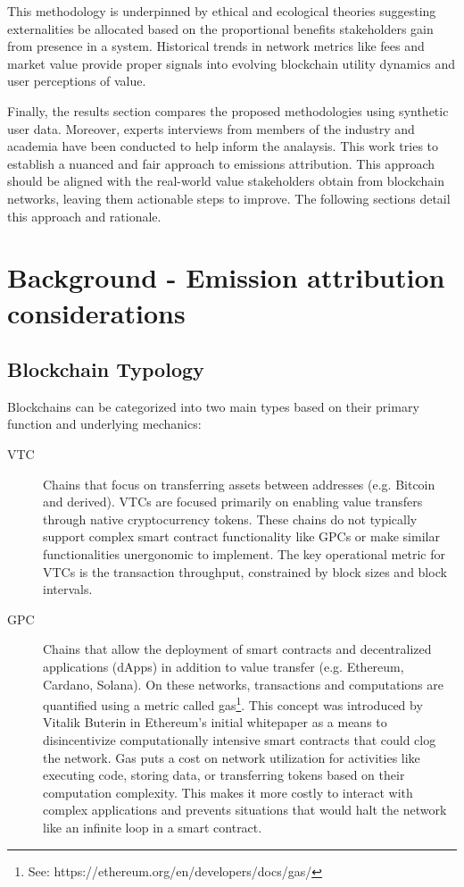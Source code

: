 \documentclass[11pt]{report}
\begin{document}
This methodology is underpinned by ethical and ecological theories suggesting externalities be allocated based on the proportional benefits stakeholders gain from presence in a system. Historical trends in network metrics like fees and market value provide proper signals into evolving blockchain utility dynamics and user perceptions of value.

Finally, the results section compares the proposed methodologies using synthetic user data. Moreover, experts interviews from members of the industry and academia have been conducted to help inform the analaysis. This work tries to establish a nuanced and fair approach to emissions attribution. This approach should be aligned with the real-world value stakeholders obtain from blockchain networks, leaving them actionable steps to improve. The following sections detail this approach and rationale.

\section{Background - Emission attribution considerations}

\subsection{Blockchain Typology \label{sec:blockchain_typology}}
Blockchains can be categorized into two main types based on their primary function and underlying mechanics:

\begin{description}
    \item[\ac{VTC}] Chains that focus on transferring assets between addresses (e.g. Bitcoin and derived). VTCs are focused primarily on enabling value transfers through native cryptocurrency tokens. These chains do not typically support complex smart contract functionality like GPCs or make similar functionalities unergonomic to implement. The key operational metric for VTCs is the transaction throughput, constrained by block sizes and block intervals.

    \item[\ac{GPC}] Chains that allow the deployment of smart contracts and decentralized applications (dApps) in addition to value transfer (e.g. Ethereum, Cardano, Solana). On these networks, transactions and computations are quantified using a metric called gas\footnote{See: https://ethereum.org/en/developers/docs/gas/}. This concept was introduced by Vitalik Buterin in Ethereum's initial whitepaper \cite{buterinEthereumNextgenerationSmart} as a means to disincentivize computationally intensive smart contracts that could clog the network. Gas puts a cost on network utilization for activities like executing code, storing data, or transferring tokens based on their computation complexity. This makes it more costly to interact with complex applications and prevents situations that would halt the network like an infinite loop in a smart contract.
\end{description}
\end{document}
